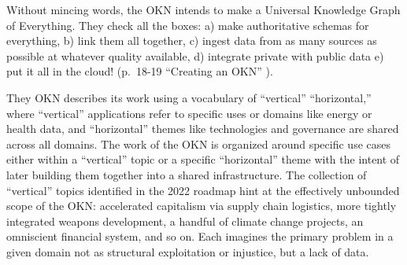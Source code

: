 Without mincing words, the OKN intends to make a Universal Knowledge
Graph of Everything. They check all the boxes: a) make authoritative schemas for everything,
b) link them all together, c) ingest data from as many sources as
possible at whatever quality available, d) integrate private with public
data e) put it all in the cloud! (p.~18-19 ``Creating an OKN'' \cite{bigdatainteragencyworkinggroupOpenKnowledgeNetwork2018} ).

They OKN describes its work using a vocabulary of ``vertical''
``horizontal,'' where ``vertical'' applications refer to specific uses
or domains like energy or health data, and ``horizontal'' themes like
technologies and governance are shared across all domains. The work of
the OKN is organized around specific use cases either within a
``vertical'' topic or a specific ``horizontal'' theme with the intent of
later building them together into a shared infrastructure. The
collection of ``vertical'' topics identified in the 2022 roadmap hint at
the effectively unbounded scope of the OKN: accelerated capitalism via
supply chain logistics, more tightly integrated weapons development, a
handful of climate change projects, an omniscient financial system, and
so on. Each imagines the primary problem in a given domain not as
structural exploitation or injustice, but a lack of data.

